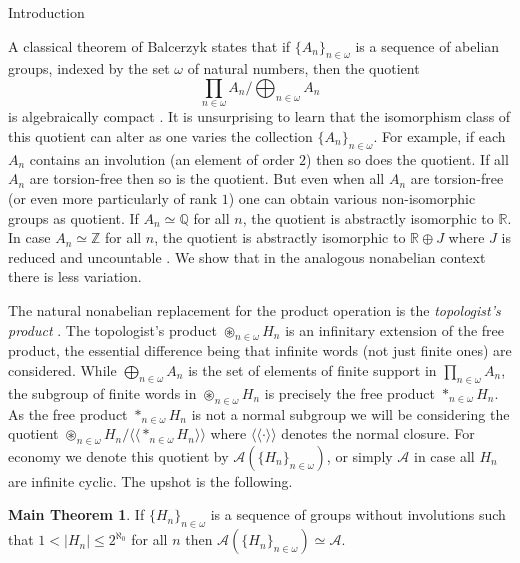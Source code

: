 \documentclass{amsart}
\theoremstyle{definition}\newtheorem{theorem}{Theorem}
\theoremstyle{definition}\newtheorem*{A}{Main Theorem}
\theoremstyle{definition}\newtheorem*{B}{Theorem \ref{elementaryequiv}}
\theoremstyle{definition}\newtheorem*{C}{Theorem \ref{continuous}}
\theoremstyle{definition}\newtheorem*{D}{Theorem \ref{bigisomorphism2}}
\theoremstyle{definition}\newtheorem{bigtheorem}{Main Theorem}
\newtheorem*{hugetheorem}{Main Theorem}
\numberwithin{theorem}{section}
\theoremstyle{definition}\newtheorem{corollary}[theorem]{Corollary}
\theoremstyle{definition}\newtheorem{proposition}[theorem]{Proposition}
\theoremstyle{definition}\newtheorem{definition}[theorem]{Definition}
\theoremstyle{definition}\newtheorem{question}[theorem]{Question}
\theoremstyle{definition}\newtheorem{example}[theorem]{Example}
\theoremstyle{definition}\newtheorem{remark}[theorem]{Remark}
\theoremstyle{definition}\newtheorem{note}[theorem]{Note}
\theoremstyle{definition}\newtheorem{lemma}[theorem]{Lemma}
\theoremstyle{definition}\newtheorem{fact}[theorem]{Fact}
\theoremstyle{definition}\newtheorem{define}[theorem]{Definition}
\theoremstyle{definition}\newtheorem{claim}[theorem]{Claim}
\theoremstyle{definition}\newtheorem{obs}[theorem]{Observation}
\theoremstyle{definition}\newtheorem{definitions}[theorem]{Definitions}
\DeclareMathOperator{\topprod}{\circledast}
\begin{document}
\begin{section}{Introduction}

A classical theorem of Balcerzyk states that if $\{A_n\}_{n \in \omega}$ is a sequence of abelian groups, indexed by the set $\omega$ of natural numbers, then the quotient $$\prod_{n \in \omega} A_n/\bigoplus_{n\in \omega} A_n$$ is algebraically compact \cite[Corollary 6.1.12]{Fu}.  It is unsurprising to learn that the isomorphism class of this quotient can alter as one varies the collection $\{A_n\}_{n\in \omega}$.  For example, if each $A_n$ contains an involution (an element of order $2$) then so does the quotient.  If all $A_n$ are torsion-free then so is the quotient.  But even when all $A_n$ are torsion-free (or even more particularly of rank $1$) one can obtain various non-isomorphic groups as quotient.  If $A_n \simeq \mathbb{Q}$ for all $n$, the quotient is abstractly isomorphic to $\mathbb{R}$.  In case $A_n \simeq \mathbb{Z}$ for all $n$, the quotient is abstractly isomorphic to $\mathbb{R} \oplus J$ where $J$ is reduced and uncountable \cite[Exercise 6.3.9]{Fu}.  We show that in the analogous nonabelian context there is less variation.


The natural nonabelian replacement for the product operation is the \emph{topologist's product} \cite{E}.  The topologist's product $\topprod_{n \in \omega} H_n$ is an infinitary extension of the free product, the essential difference being that infinite words (not just finite ones) are considered.  While $\bigoplus_{n \in \omega} A_n$ is the set of elements of finite support in $\prod_{n \in \omega}A_n$, the subgroup of finite words in $\topprod_{n \in \omega} H_n$ is precisely the free product $*_{n \in \omega} H_n$.   As the free product $*_{n \in \omega} H_n$ is not a normal subgroup we will be considering the quotient $\topprod_{n \in \omega} H_n/\langle\langle *_{n \in \omega}H_n\rangle\rangle$ where $\langle\langle \cdot \rangle\rangle$ denotes the normal closure.  For economy we denote this quotient by $\mathcal{A}(\{H_n\}_{n\in \omega})$, or simply $\mathcal{A}$ in case all $H_n$ are infinite cyclic.  The upshot is the following.

\begin{hugetheorem}\label{bigisomorphism}  If $\{H_n\}_{n \in \omega}$ is a sequence of groups without involutions such that $1 < |H_n| \leq 2^{\aleph_0}$ for all $n$ then $\mathcal{A}(\{H_n\}_{n \in \omega}) \simeq \mathcal{A}$.
\end{hugetheorem}


\end{section}
\end{document}
